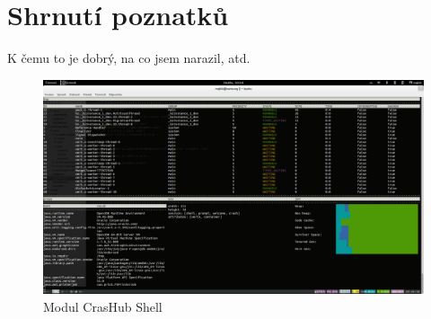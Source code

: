 \chapter{Shrnutí poznatků}

K čemu to je dobrý, na co jsem narazil, atd.


\begin{figure}[h]
\begin{centering}
\includegraphics[scale=0.21]{images/real_interaction}
\par\end{centering}
\caption{Modul CrasHub Shell\label{fig:real_interaction}}
\end{figure}

